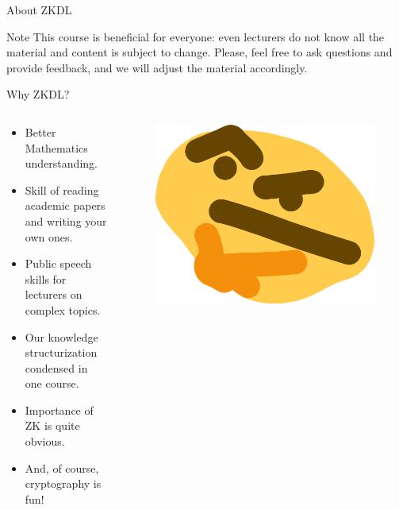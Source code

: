 \documentclass{beamer}
\begin{document}
\begin{frame}{About ZKDL}
      \begin{alertblock}{Note}
        This course is beneficial for everyone: even lecturers do not know all the material and content is subject to change. Please, feel free to ask questions and provide feedback, and we will adjust the material accordingly.
      \end{alertblock}

    \end{frame}

    \begin{frame}{Why ZKDL?}

      \begin{columns}
        \begin{column}{0.65\textwidth}
          \begin{itemize}
            \item Better Mathematics understanding.
            \item Skill of reading academic papers and writing your own ones.
            \item Public speech skills for lecturers on complex topics.
            \item Our knowledge structurization condensed in one course.
            \item Importance of ZK is quite obvious.
            \item And, of course, cryptography is fun!
          \end{itemize}
        \end{column}
        \begin{column}{0.35\textwidth}
            \begin{figure}
            \centering
                \includegraphics[width=\textwidth]{images/lecture_1/thonk.png}
            \end{figure}
        \end{column}
        \end{columns}
        

\end{frame}
\end{document}
